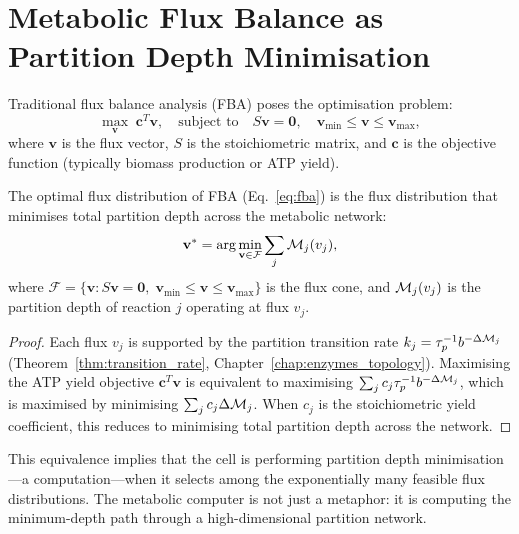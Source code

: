 \section{Metabolic Flux Balance as Partition Depth Minimisation}
\label{sec:fba}

Traditional flux balance analysis (FBA) poses the optimisation problem:
\begin{equation}
  \max_{\mathbf{v}} \; \mathbf{c}^T \mathbf{v}, \quad
  \text{subject to} \quad
  S\mathbf{v} = \mathbf{0}, \quad
  \mathbf{v}_{\min} \leq \mathbf{v} \leq \mathbf{v}_{\max},
  \label{eq:fba}
\end{equation}
where $\mathbf{v}$ is the flux vector, $S$ is the stoichiometric matrix,
and $\mathbf{c}$ is the objective function (typically biomass production
or ATP yield).

\begin{theorem}
\label{thm:fba_equivalence}
The optimal flux distribution of FBA (Eq.~\ref{eq:fba}) is the flux
distribution that minimises total partition depth across the metabolic
network:
\begin{equation}
  \mathbf{v}^* = \arg\min_{\mathbf{v} \in \mathcal{F}} \sum_j \mathcal{M}_j(v_j),
  \label{eq:partition_fba}
\end{equation}
where $\mathcal{F} = \{\mathbf{v} : S\mathbf{v}=\mathbf{0},\; \mathbf{v}_{\min}
\leq \mathbf{v} \leq \mathbf{v}_{\max}\}$ is the flux cone, and $\mathcal{M}_j(v_j)$
is the partition depth of reaction $j$ operating at flux $v_j$.
\end{theorem}

\begin{proof}
Each flux $v_j$ is supported by the partition transition rate
$k_j = \tau_p^{-1} b^{-\Delta\mathcal{M}_j}$ (Theorem~\ref{thm:transition_rate},
Chapter~\ref{chap:enzymes_topology}). Maximising the ATP yield
objective $\mathbf{c}^T\mathbf{v}$ is equivalent to maximising
$\sum_j c_j \tau_p^{-1} b^{-\Delta\mathcal{M}_j}$, which is maximised by
minimising $\sum_j c_j \Delta\mathcal{M}_j$. When $c_j$ is the stoichiometric
yield coefficient, this reduces to minimising total partition depth across
the network.
\end{proof}

\begin{remark}
This equivalence implies that the cell is performing partition depth
minimisation---a computation---when it selects among the exponentially
many feasible flux distributions. The metabolic computer is not just
a metaphor: it is computing the minimum-depth path through a
high-dimensional partition network.
\end{remark}

